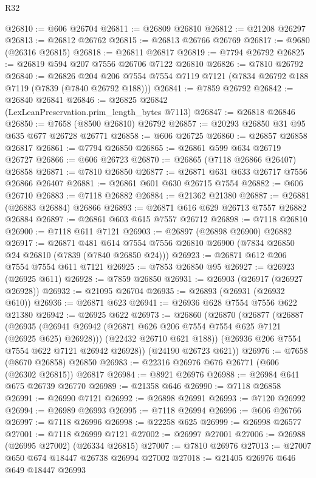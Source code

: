 \begin{lexlean}{R32}
\begin{coremodule}
@26810 := @606 @26704
@26811 := @26809 @26810
@26812 := @21208 @26297
@26813 := @26812 @26762
@26815 := @26813 @26766 @26769
@26817 := @9680 (@26316 @26815)
@26818 := @26811 @26817
@26819 := @7794 @26792
@26825 := @26819 @594 @207 @7556 @26706 @7122 @26810
@26826 := @7810 @26792
@26840 := @26826
    @204
    @206
    @7554
    @7554
    @7119
    @7121
    (@7834 @26792 @188 @7119 (@7839 (@7840 @26792 @188)))
@26841 := @7859 @26792
@26842 := @26840 @26841
@26846 := @26825 @26842 (LexLeanPreservation.prim_length_bytes @7113)
@26847 := @26818 @26846
@26850 := @7658 (@8500 @26810) @26792
@26857 := @20293 @26850 @31 @95 @635 @677 @26728 @26771
@26858 := @606 @26725
@26860 := @26857 @26858 @26817
@26861 := @7794 @26850
@26865 := @26861 @599 @634 @26719 @26727
@26866 := @606 @26723
@26870 := @26865 (@7118 @26866 @26407) @26858
@26871 := @7810 @26850
@26877 := @26871 @631 @633 @26717 @7556 @26866 @26407
@26881 := @26861 @601 @630 @26715 @7554
@26882 := @606 @26710
@26883 := @7118 @26882
@26884 := @21362 @21380
@26887 := @26881 (@26883 @26884) @26866
@26893 := @26871 @616 @629 @26713 @7557 @26882 @26884
@26897 := @26861 @603 @615 @7557 @26712
@26898 := @7118 @26810
@26900 := @7118 @611 @7121
@26903 := @26897 (@26898 @26900) @26882
@26917 := @26871
    @481
    @614
    @7554
    @7556
    @26810
    @26900
    (@7834 @26850 @24 @26810 (@7839 (@7840 @26850 @24)))
@26923 := @26871 @612 @206 @7554 @7554 @611 @7121
@26925 := @7853 @26850 @95
@26927 := @26923 (@26925 @611)
@26928 := @7859 @26850
@26931 := @26903 (@26917 (@26927 @26928))
@26932 := @21095 @26704
@26935 := @26893 (@26931 (@26932 @610))
@26936 := @26871 @623
@26941 := @26936 @628 @7554 @7556 @622 @21380
@26942 := @26925 @622
@26973 := @26860
    (@26870
      (@26877
        (@26887
          (@26935 (@26941 @26942 (@26871 @626 @206 @7554 @7554 @625 @7121 (@26925 @625) @26928)))
          (@22432 @26710 @621 @188))
        (@26936 @206 @7554 @7554 @622 @7121 @26942 @26928))
      (@24190 @26723 @621))
@26976 := @7658 (@8670 @26858) @26850
@26983 := @22316 @26976 @676 @26771 (@606 (@26302 @26815)) @26817
@26984 := @8921 @26976
@26988 := @26984 @641 @675 @26739 @26770
@26989 := @21358 @646
@26990 := @7118 @26858
@26991 := @26990 @7121
@26992 := @26898 @26991
@26993 := @7120 @26992
@26994 := @26989 @26993
@26995 := @7118 @26994
@26996 := @606 @26766
@26997 := @7118 @26996
@26998 := @22258 @625
@26999 := @26998 @26577
@27001 := @7118 @26999 @7121
@27002 := @26997 @27001
@27006 := @26988 (@26995 @27002) (@26334 @26815)
@27007 := @7810 @26976
@27013 := @27007 @650 @674 @18447 @26738 @26994 @27002
@27018 := @21405 @26976 @646 @649 @18447 @26993

\end{coremodule}
\end{lexlean}
